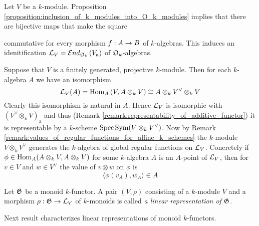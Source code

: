 \begin{remark}\label{remark:general_linear_monoid}
Let $V$ be a $k$-module. Proposition \ref{proposition:inclusion_of_k_modules_into_O_k_modules} implies that there are bijective maps that make the square
\begin{center}
\end{center}
commutative for every morphism $f:A\rightarrow B$ of $k$-algebras. This induces an idenitification ${\mathcal L}_V = {\mathcal E} nd_{{\mathfrak O}_k}\left(V_{\mathrm{a}}\right)$ of ${\mathfrak O}_k$-algebras.
\end{remark}

\begin{remark}\label{remark:representability_of_linear_monoid}
Suppose that $V$ is a finitely generated, projective $k$-module. Then for each $k$-algebra $A$ we have an isomorphism
$${\mathcal L}_V(A) = \mathrm{Hom}_A\left(V,A\otimes_kV\right) \cong A\otimes_kV^{\vee}\otimes_kV$$
Clearly this isomorphism is natural in $A$. Hence ${\mathcal L}_V$ is isomorphic with $\left(V^{\vee}\otimes_kV\right)_{\mathrm{a}}$ and thus (Remark \ref{remark:representability_of_additive_functor}) it is representable by a $k$-scheme $\mathrm{Spec}\, \textrm{Sym}(V\otimes_kV^{\vee})$. Now by Remark \ref{remark:values_of_regular_functions_for_affine_k_schemes} the $k$-module $V\otimes_kV^{\vee}$ generates the $k$-algebra of global regular functions on ${\mathcal L}_V$. Concretely if $\phi\in \mathrm{Hom}_A(A\otimes_kV,A\otimes_kV)$ for some $k$-algebra $A$ is an $A$-point of ${\mathcal L}_V$, then for $v\in V$ and $w\in V^{\vee}$ the value of $v\otimes w$ on $\phi$ is
$$\langle \phi(v_A),w_A\rangle \in A$$
\end{remark}

\begin{definition}
Let ${\mathfrak G}$ be a monoid $k$-functor. A pair $\left(V,\rho\right)$ consisting of a $k$-module $V$ and a morphism $\rho:{\mathfrak G}\rightarrow {\mathcal L}_V$ of $k$-monoids is called \textit{a linear representation of ${\mathfrak G}$}.
\end{definition}
\noindent
Next result characterizes linear representations of monoid $k$-functors.

